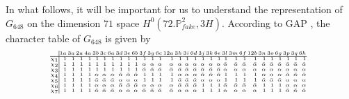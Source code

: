 \documentclass[11pt,reqno]{amsart}
\def\P {{\mathbb P}}
\def\FPP {{\P^2_{fake}}}
\theoremstyle{definition}
\numberwithin{equation}{section}
\begin{document}
In what follows, it will be important for us  to understand the representation of $G_{648}$ on the dimension $71$ space $H^0(72.\FPP,3H)$. 
According to GAP \cite{GAP}, the character table of $G_{648}$ is given 
by
$$
\hskip -4pt
\tiny
\renewcommand{\arraystretch}{0.9}
\setlength{\arraycolsep}{0.6pt}
\begin{array}{l | rrrrrrrrrrrrrrrrrrrrrrrrrrrrrr}
 &1a &3a &2a &4a & 3b & 3c& 6a & 3d & 3e &6b &3f & 3g&  6c& 12a & 3h&  3i& 6d & 3j & 3k &6e& 3l & 3m & 6f& 12b & 3n & 3o& 6g & 3p & 3q& 6h\\
 \hline
\chi_1&      1&  1&  1&  1&   1&   1&  1&   1&   1&  1&  1&   1&   1&   1&   1&   1&  1&   1&   1&  1&  1&   1&   1&   1&   1&   1&  1&   1&   1&  1\\
\chi_2&      1&  1&  1&  1&   1&   1&  1&   1&   1&  1&  \alpha&   \alpha&   \alpha&   \alpha&   \alpha&   \alpha&  \alpha&   \alpha&   \alpha&  \alpha& \bar\alpha&  \bar\alpha&  \bar\alpha&  \bar\alpha&  \bar\alpha&  \bar\alpha& \bar\alpha&  \bar\alpha&  \bar\alpha& \bar\alpha\\
\chi_3 &     1&  1&  1&  1&   1&   1&  1&   1&   1&  1& \bar\alpha&  \bar\alpha&  \bar\alpha&  \bar\alpha&  \bar\alpha&  \bar\alpha& \bar\alpha&  \bar\alpha&  \bar\alpha& \bar\alpha&  \alpha&   \alpha&   \alpha&   \alpha&   \alpha&   \alpha&  \alpha&   \alpha&   \alpha&  \alpha\\
\chi_4  &    1&  1&  1&  1&   \alpha&   \alpha&  \alpha&  \bar\alpha&  \bar\alpha& \bar\alpha&  1&   1&   1&   1&   \alpha&   \alpha&  \alpha&  \bar\alpha&  \bar\alpha& \bar\alpha&  1&   1&   1&   1&   \alpha&   \alpha&  \alpha&  \bar\alpha&  \bar\alpha& \bar\alpha\\
\chi_5  &    1&  1&  1&  1&  \bar\alpha&  \bar\alpha& \bar\alpha&   \alpha&   \alpha&  \alpha&  1&   1&   1&   1&  \bar\alpha&  \bar\alpha& \bar\alpha&   \alpha&   \alpha&  \alpha&  1&   1&   1&   1&  \bar\alpha&  \bar\alpha& \bar\alpha&   \alpha&   \alpha&  \alpha\\
\chi_6  &    1&  1&  1&  1&   \alpha&   \alpha&  \alpha&  \bar\alpha&  \bar\alpha& \bar\alpha&  \alpha&   \alpha&   \alpha&   \alpha&  \bar\alpha&  \bar\alpha& \bar\alpha&   1&   1&  1& \bar\alpha&  \bar\alpha&  \bar\alpha&  \bar\alpha&   1&   1&  1&   \alpha&   \alpha&  \alpha\\
\chi_7  &    1&  1&  1&  1&  \bar\alpha&  \bar\alpha& \bar\alpha&   \alpha&   \alpha&  \alpha& \bar\alpha&  \bar\alpha&  \bar\alpha&  \bar\alpha&   \alpha&   \alpha&  \alpha&   1&   1&  1&  \alpha&   \alpha&   \alpha&   \alpha&   1&   1&  1&  \bar\alpha&  \bar\alpha& \bar\alpha\\

\end{array}$$
\end{document}
